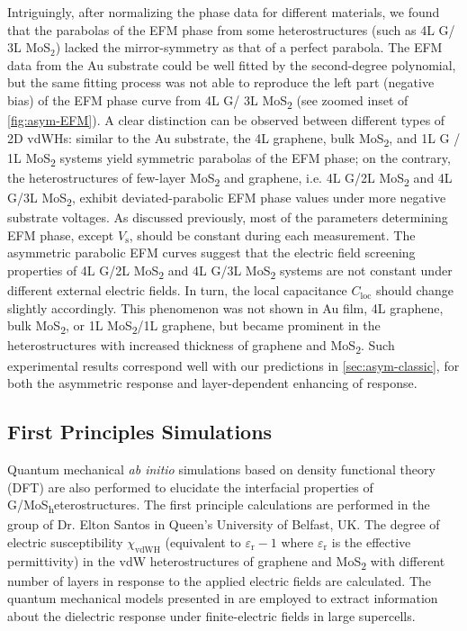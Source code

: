%
Intriguingly, after normalizing the phase data for different
materials, we found that the parabolas of the EFM phase from some
heterostructures (such as 4L G/ 3L MoS$_{2}$) lacked the
mirror-symmetry as that of a perfect parabola.
%
The EFM data from the Au substrate could be well fitted by the
second-degree polynomial, but the same fitting process was not able to
reproduce the left part (negative bias) of the EFM phase curve from 4L
G/ 3L MoS\textsubscript{2} (see zoomed inset of
\autoref{fig:asym-EFM}).
%
A clear distinction can be observed between different types of 2D
vdWHs: similar to the Au substrate, the 4L graphene, bulk
MoS\textsubscript{2}, and 1L G / 1L MoS\textsubscript{2} systems yield
symmetric parabolas of the EFM phase; on the contrary, the
heterostructures of few-layer MoS\textsubscript{2} and graphene,
i.e. 4L G/2L MoS\textsubscript{2} and 4L G/3L
MoS\textsubscript{2}, exhibit deviated-parabolic EFM phase
values under more negative substrate voltages.
%
%
As discussed previously, most of the parameters determining EFM phase,
except $V_{\mathrm{s}}$, should be constant during each
measurement. The asymmetric parabolic EFM curves suggest that the
electric field screening properties of 4L G/2L MoS\textsubscript{2} and 4L G/3L MoS\textsubscript{2} systems are not
constant under different external electric fields. In turn, the local capacitance $C_{\mathrm{loc}}$ should change slightly
accordingly. This phenomenon was not shown in Au film, 4L graphene,
bulk MoS\textsubscript{2}, or 1L MoS\textsubscript{2}/1L graphene, but
became prominent in the heterostructures with increased thickness of
graphene and MoS\textsubscript{2}.
%
Such experimental results correspond well with our predictions in
\autoref{sec:asym-classic}, for both the asymmetric response and
layer-dependent enhancing of response.

\subsection{First Principles Simulations}
\label{sec:mult-theor-model}

Quantum mechanical \textit{ab initio} simulations based on
density functional theory (DFT) are also performed to elucidate the interfacial properties of G/MoS\textsubscript
heterostructures.
The first principle calculations are performed in the group of Dr. Elton Santos in Queen's University of Belfast, UK.
%
The degree of electric susceptibility $\chi_{\mathrm{vdWH}}$ (equivalent to
$\varepsilon_{\mathrm{r}} - 1$ where $\varepsilon_{\mathrm{r}}$ is the
effective permittivity) in the vdW heterostructures of graphene and
MoS\textsubscript{2} with different number of layers in response to
the applied electric fields are calculated.
%
The quantum mechanical models presented in
\autocite{Santos_2013_tunable_eps_gr,Santos_2013_ACSnano_kaxi} are
employed to extract information about the dielectric response under
finite-electric fields in large supercells.
%


